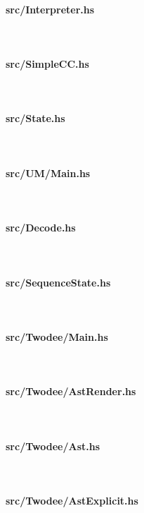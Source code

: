 \documentclass[a4paper, oneside, 10pt, final]{memoir}
\begin{document}
\paragraph{src/Interpreter.hs}\ \\

\clearpage\paragraph{src/SimpleCC.hs}\ \\

\clearpage\paragraph{src/State.hs}\ \\

\clearpage\paragraph{src/UM/Main.hs}\ \\

\clearpage\paragraph{src/Decode.hs}\ \\

\clearpage\paragraph{src/SequenceState.hs}\ \\

\clearpage\paragraph{src/Twodee/Main.hs}\ \\

\clearpage\paragraph{src/Twodee/AstRender.hs}\ \\

\clearpage\paragraph{src/Twodee/Ast.hs}\ \\

\clearpage\paragraph{src/Twodee/AstExplicit.hs}\ \\
\end{document}
